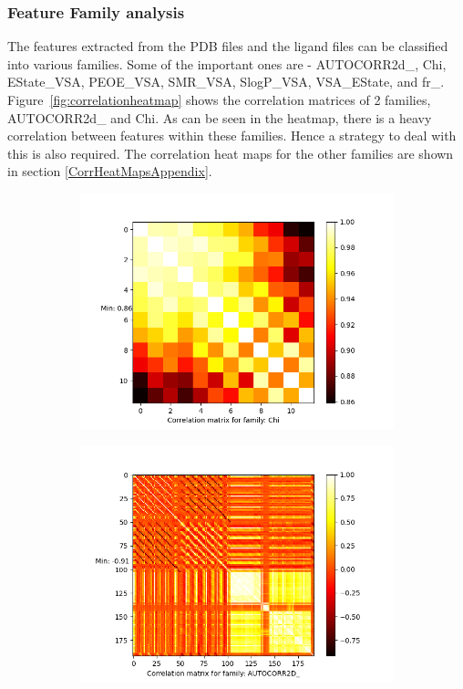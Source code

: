 \documentclass[11pt]{article}
\begin{document}
\subsubsection{Feature Family analysis}
\label{CorrelationAnalysis}
The features extracted from the PDB files and the ligand files can be classified into various families.
Some of the important ones are - AUTOCORR2d\_, Chi, EState\_VSA,  PEOE\_VSA,  SMR\_VSA,  SlogP\_VSA,  VSA\_EState, and fr\_.
Figure~\ref{fig:correlationheatmap} shows the correlation matrices of 2 families, AUTOCORR2d\_ and Chi.
As can be seen in the heatmap, there is a heavy correlation between features within these families.
Hence a strategy to deal with this is also required.
The correlation heat maps for the other families are shown in section \ref{CorrHeatMapsAppendix}.

\begin{figure}[htb]
    \begin{subfigure}[b]{0.45\textwidth}
         \centering
         \includegraphics[scale=0.45]{images/correlationChi}
        \label{fig:correlationChi}
     \end{subfigure}
     \hfill
    \begin{subfigure}[b]{0.45\textwidth}
         \centering
         \includegraphics[scale=0.45]{images/correlationAUTOCORR2D}

\end{subfigure}
\end{figure}
\end{document}

